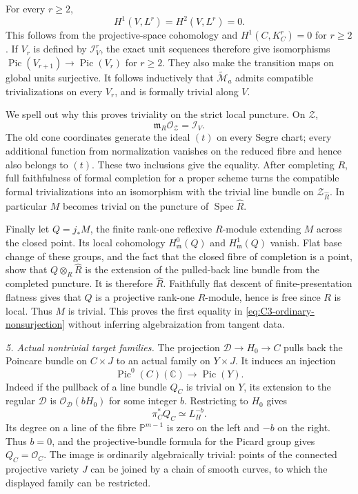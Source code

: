For every $r\ge2$,
\[
                  H^1(V,L^r)=H^2(V,L^r)=0.
\]
This follows from the projective-space
cohomology and $H^1(C,K_C^r)=0$ for $r\ge2$.
If $V_r$ is defined by $\mathcal I_V^r$,
the exact unit sequences therefore give
isomorphisms
$\operatorname{Pic}(V_{r+1})\to\operatorname{Pic}(V_r)$
for $r\ge2$. They also make the transition
maps on global units surjective. It follows
inductively that $\widetilde{\mathcal M}_a$
admits compatible trivializations on every
$V_r$, and is formally trivial along $V$.

We spell out why this proves triviality on
the strict local puncture. On $\mathcal Z$,
\[
                        \mathfrak m_R\mathcal O_{\mathcal Z}
                                          =\mathcal I_V.
\]
The old cone coordinates generate the ideal
$(t)$ on every Segre chart; every additional
function from normalization vanishes on the
reduced fibre and hence also belongs to
$(t)$. These two inclusions give the equality.
After completing $R$, full faithfulness of
formal completion for a proper scheme
\citep[Lemma 30.24.1, Tag 0883]{D_StacksFormalPicard}
turns the compatible formal trivializations
into an isomorphism with the trivial line
bundle on $\mathcal Z_{\widehat R}$. In
particular $M$ becomes trivial on the
puncture of $\operatorname{Spec}\widehat R$.

Finally let $Q=j_*M$, the finite rank-one
reflexive $R$-module extending $M$ across
the closed point. Its local cohomology
$H^0_{\mathfrak m}(Q)$ and
$H^1_{\mathfrak m}(Q)$ vanish. Flat base
change of these groups, and the fact that
the closed fibre of completion is a point,
show that $Q\otimes_R\widehat R$ is the
extension of the pulled-back line bundle
from the completed puncture. It is therefore
$\widehat R$. Faithfully flat descent of
finite-presentation flatness gives that $Q$
is a projective rank-one $R$-module, hence
is free since $R$ is local. Thus $M$ is
trivial. This proves the first equality in
\eqref{eq:C3-ordinary-nonsurjection} without
inferring algebraization from tangent data.

\emph{5. Actual nontrivial target families.}
The projection $\mathcal D\to H_0\to C$
pulls back the Poincare bundle on $C\times J$
to an actual family on $Y\times J$.
It induces an injection
\[
                     \operatorname{Pic}^0(C)(\mathbb C)
                              \longrightarrow\operatorname{Pic}(Y).
\]
Indeed if the pullback of a line bundle $Q_C$
is trivial on $Y$, its extension to the
regular $\mathcal D$ is
$\mathcal O_{\mathcal D}(bH_0)$ for some
integer $b$. Restricting to $H_0$ gives
\[
                    \pi_C^*Q_C\simeq L_H^{-b}.
\]
Its degree on a line of the fibre
$\mathbb P^{m-1}$ is zero on the left and
$-b$ on the right. Thus $b=0$, and the
projective-bundle formula for the Picard
group gives $Q_C=\mathcal O_C$. The image
is ordinarily algebraically trivial:
points of the connected projective variety
$J$ can be joined by a chain of smooth
curves, to which the displayed family can
be restricted.

